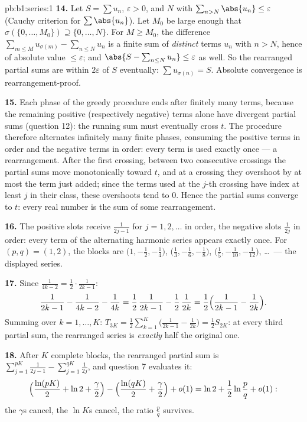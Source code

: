 \begin{solution}{pb:b1:series:1}
\textbf{14.} Let $S = \sum u_n$, $\varepsilon > 0$, and $N$ with
$\sum_{n > N} \abs{u_n} \leq \varepsilon$ (Cauchy criterion for
$\sum\abs{u_n}$). Let $M_0$ be large enough that $\sigma(\{0,
\dots, M_0\}) \supseteq \{0, \dots, N\}$. For $M \geq M_0$, the
difference $\sum_{m \leq M} u_{\sigma(m)} - \sum_{n \leq N} u_n$
is a finite sum of \emph{distinct} terms $u_n$ with $n > N$,
hence of absolute value $\leq \varepsilon$; and $\abs{S -
\sum_{n\leq N} u_n} \leq \varepsilon$ as well. So the rearranged
partial sums are within $2\varepsilon$ of $S$ eventually:
$\sum u_{\sigma(n)} = S$. Absolute convergence is
rearrangement-proof.

\textbf{15.} Each phase of the greedy procedure ends after
finitely many terms, because the remaining positive
(respectively negative) terms alone have divergent partial sums
(question 12): the running sum must eventually cross $t$. The
procedure therefore alternates infinitely many finite phases,
consuming the positive terms in order and the negative terms in
order: every term is used exactly once --- a rearrangement.
After the first crossing, between two consecutive crossings the
partial sums move monotonically toward $t$, and at a crossing
they overshoot by at most the term just added; since the terms
used at the $j$-th crossing have index at least $j$ in their
class, these overshoots tend to $0$. Hence the partial sums
converge to $t$: every real number is the sum of some
rearrangement.

\textbf{16.} The positive slots receive $\frac{1}{2j-1}$ for
$j = 1, 2, \dots$ in order, the negative slots $\frac{1}{2j}$ in
order: every term of the alternating harmonic series appears
exactly once. For $(p, q) = (1, 2)$, the blocks are
$\bigl(1, -\frac12, -\frac14\bigr)$, $\bigl(\frac13, -\frac16,
-\frac18\bigr)$, $\bigl(\frac15, -\frac1{10},
-\frac1{12}\bigr)$, \dots\ --- the displayed series.

\textbf{17.} Since $\frac{1}{4k-2} = \frac12\cdot\frac{1}{2k-1}$:
\[
\frac{1}{2k-1} - \frac{1}{4k-2} - \frac{1}{4k}
= \frac12\,\frac{1}{2k-1} - \frac12\,\frac{1}{2k}
= \frac12\Bigl(\frac{1}{2k-1} - \frac{1}{2k}\Bigr).
\]
Summing over $k = 1, \dots, K$: $T_{3K} = \frac12
\sum_{k=1}^{K}\bigl(\frac{1}{2k-1} - \frac{1}{2k}\bigr) =
\frac12 S_{2K}$: at every third partial sum, the rearranged
series is \emph{exactly} half the original one.

\textbf{18.} After $K$ complete blocks, the rearranged partial
sum is $\sum_{j=1}^{pK}\frac{1}{2j-1} -
\sum_{j=1}^{qK}\frac{1}{2j}$, and question 7 evaluates it:
\[
\Bigl(\frac{\ln(pK)}{2} + \ln 2 + \frac\gamma2\Bigr)
- \Bigl(\frac{\ln(qK)}{2} + \frac\gamma2\Bigr) + o(1)
= \ln 2 + \frac12\ln\frac pq + o(1) :
\]
the $\gamma$s cancel, the $\ln K$s cancel, the ratio
$\frac pq$ survives.


\end{solution}
